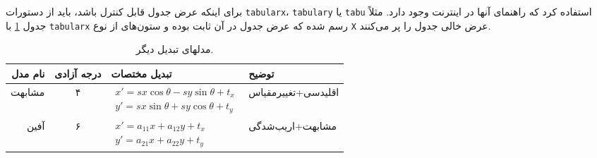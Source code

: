 برای اینکه عرض جدول قابل کنترل باشد، باید از دستورات
\verb|tabularx|،
\verb|tabulary| یا
\verb|tabu|
استفاده کرد که راهنمای آنها در اینترنت وجود دارد.
مثلاً جدول
\ref{tab:motionModelsCont}
با
\verb|tabularx|
رسم شده که عرض جدول در آن ثابت بوده و ستون‌های از نوع
\verb|X|
عرض خالی جدول را پر می‌کنند.
\begin{table}[ht]
  \caption{مدلهای تبدیل دیگر.}
  \label{tab:motionModelsCont}
  \centering
  \onehalfspacing
  \begin{tabularx}{\textwidth}{|r|c|l|X|}
    \hline نام مدل & درجه آزادی & تبدیل مختصات                & توضیح              \\
    \hline مشابهت  & ۴          & $\begin{aligned} x'=sx\cos\theta - sy\sin\theta+t_x \\ y'=sx\sin\theta+sy\cos\theta+t_y  \end{aligned}$ & اقلیدسی+تغییرمقیاس \\
    \hline آفین    & ۶          & $\begin{aligned} x'=a_{11}x+a_{12}y+t_x \\ y'=a_{21}x+a_{22}y+t_y \end{aligned}$ & مشابهت+اریب‌شدگی    \\
    \hline
  \end{tabularx}
\end{table}

